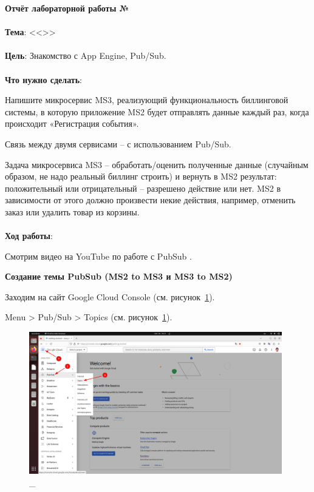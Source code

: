 \documentclass[12pt, a4paper, simple]{eskdtext}
\begin{document}
  

  \begin{center}
    \textbf{Отчёт лабораторной работы №\envReportLabNumber}
  \end{center}

  \paragraph{} \textbf{Тема}: <<\envReportTitle>>

  \paragraph{} \textbf{Цель}:
  Знакомство с App Engine, Pub/Sub.

  \paragraph{} \textbf{Что нужно сделать}:

  Напишите микросервис MS3, реализующий функциональность биллинговой системы,
  в которую приложение MS2 будет отправлять данные каждый раз, когда происходит «Регистрация события». 

  Связь между двумя сервисами – с использованием Pub/Sub.

  Задача микросервиса MS3 – обработать/оценить полученные данные (случайным образом, не надо реальный биллинг строить)
  и вернуть в MS2 результат: положительный или отрицательный – разрешено действие или нет.
  MS2 в зависимости от этого должно произвести некие действия, например, отменить заказ или удалить товар из корзины.

  \paragraph{} \textbf{Ход работы}:

  Смотрим видео на YouTube по работе с PubSub \cite{YouTube_PubSub}.

  \textbf{Создание темы PubSub (MS2 to MS3 и MS3 to MS2)}

  Заходим на сайт Google Cloud Console \cite{GoogleCloudConsole} (см. рисунок~\ref{fig:1}).

  Menu > Pub/Sub > Topics \cite{GoogleCloudPubSubTopic} (см. рисунок~\ref{fig:1}).

  \begin{figure}[!h]
    \centering
    \includegraphics[width=11cm]
    {images/2023-02-26_16-32-28.png}
    \caption{\_}
    \label{fig:1}
  \end{figure}
\end{document}
